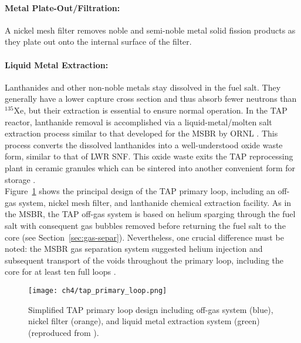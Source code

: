 \paragraph*{Metal Plate-Out/Filtration:} A nickel mesh filter removes noble 
and semi-noble metal solid fission products as they plate out onto the 
internal surface of the filter.
\paragraph*{Liquid Metal Extraction:} Lanthanides and other non-noble metals 
stay dissolved in the fuel salt. They generally have a lower capture cross 
section and thus absorb fewer neutrons than $^{135}$Xe, but their extraction 
is essential to ensure normal operation. In the \gls{TAP} reactor, lanthanide 
removal is accomplished via a liquid-metal/molten salt extraction process 
similar to that developed for the \gls{MSBR} by \gls{ORNL}  
\cite{robertson_conceptual_1971}. This process converts the dissolved 
lanthanides into a well-understood oxide waste form, similar to that of 
\gls{LWR} \gls{SNF}. This oxide waste exits the \gls{TAP} reprocessing 
plant in ceramic granules which can be sintered into another convenient form 
for storage \cite{transatomic_power_corporation_technical_2016}.\\

Figure~\ref{fig:tap-reproc} shows the principal design of the \gls{TAP} 
primary loop, including an off-gas system, nickel mesh filter, and lanthanide 
chemical extraction facility. As in the \gls{MSBR}, the \gls{TAP} off-gas 
system is based on helium sparging through the fuel salt with consequent gas 
bubbles removed before returning the fuel salt to the core (see 
Section~\ref{sec:gas-separ}). 
Nevertheless, one crucial difference must be noted: the \gls{MSBR} gas 
separation system suggested helium injection and subsequent transport of the 
voids throughout the primary loop, including the core for at least ten full 
loops \cite{robertson_conceptual_1971}. 
\begin{figure}[htp!] %
	\centering
	\texttt{[image: ch4/tap\_primary\_loop.png]}
	\caption{Simplified \gls{TAP} primary loop design including off-gas system 
		(blue), nickel filter (orange), and liquid metal extraction system 
		(green) (reproduced from \cite{transatomic_power_transatomic_2019}).}
	\label{fig:tap-reproc}
\end{figure}

